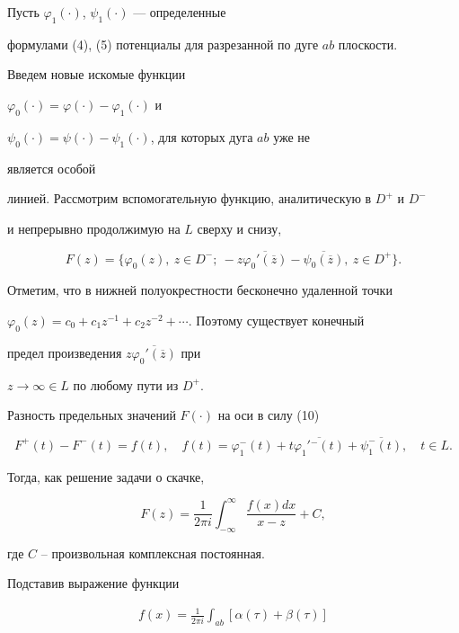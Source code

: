 \begin{pf}


Пусть $\varphi_1(\cdot)$, $\psi_1(\cdot)$ --- определенные


формулами (4), (5) потенциалы для разрезанной по дуге $ab$ плоскости.


Введем новые искомые функции


$\varphi_0(\cdot)=\varphi(\cdot)-\varphi_1(\cdot)$ и


$\psi_0(\cdot)=\psi(\cdot)-\psi_1(\cdot)$, для которых дуга $ab$ уже не


является особой


линией. Рассмотрим вспомогательную функцию, аналитическую в $D^+$ и $D^-$


и непрерывно продолжимую на $L$ сверху и снизу,


$$


F(z) = \big\{ \varphi_0(z),\ z\in D^-;


\ -z\overline{\varphi_0'(\overline{z})} -\overline{\psi_0(\overline{z})},


\ z\in D^+ \big\}.


$$


Отметим, что в нижней полуокрестности бесконечно удаленной точки


$\varphi_0(z)=c_0+c_1z^{-1}+c_2z^{-2}+\dotsb$. Поэтому существует конечный


предел произведения $z\overline{\varphi_0'(\overline{z})}$ при


$z\to\infty\in L$ по любому пути из $D^+$.


Разность предельных значений $F(\cdot)$ на оси в силу (10)


$$


F^+(t)-F^-(t)=f(t),\quad


f(t)=\varphi_1^-(t)+t\overline{\varphi_1'{}^-(t)}+\overline{\psi_1^-(t)},


\quad t\in L.


$$


Тогда, как решение задачи о скачке,


$$


F(z) = \frac{1}{2\pi i}\int_{-\infty}^{\infty}\frac{f(x)dx}{x-z}+C,


$$


где $C$ -- произвольная комплексная постоянная.


Подставив выражение функции


\begin{multline}


f(x) = \frac{1}{2\pi i}\int_{ab} [\alpha(\tau)+\beta(\tau)]



\end{multline}
\end{pf}
